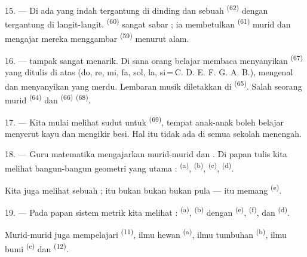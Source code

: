 15. --- Di  ada  yang
indah tergantung di dinding dan sebuah 
\textsuperscript{(62)} dengan  tergantung di
langit-langit.  \textsuperscript{(60)} sangat sabar ;
ia membetulkan  \textsuperscript{(61)} murid dan
mengajar mereka menggambar 
\textsuperscript{(59)} menurut alam.

16. ---  tampak sangat menarik. Di sana orang
belajar membaca  menyanyikan 
\textsuperscript{(67)} yang ditulis di atas 
(do, re, mi, fa, sol, la, si\,=\,C. D. E. F. G. A. B.), mengenal
 dan menyanyikan  yang merdu.
Lembaran musik diletakkan di 
\textsuperscript{(65)}. Salah seorang murid 
\textsuperscript{(64)} dan  \textsuperscript{(66)}
 \textsuperscript{(68)}.

17. --- Kita mulai melihat sudut  untuk
 \textsuperscript{(69)}, tempat anak-anak
boleh belajar menyerut kayu dan mengikir besi. Hal itu tidak ada di
semua sekolah menengah.

\VUsaut{5.0mm}
\VUsaut{3.6mm}

18. --- Guru matematika mengajarkan  murid-murid
 dan . Di papan tulis kita melihat bangun-bangun geometri yang
utama :  \textsuperscript{(a)},  \textsuperscript{(b)}, 
\textsuperscript{(c)},  \textsuperscript{(d)}.

Kita juga melihat sebuah  ; itu bukan
 bukan  bukan pula
 — itu memang 
\textsuperscript{(e)}.

19. --- Pada papan sistem metrik kita melihat : 
\textsuperscript{(a)},  \textsuperscript{(b)} dengan
  \textsuperscript{(e)},
 \textsuperscript{(f)},  dan
 \textsuperscript{(d)}.

Murid-murid juga mempelajari  \textsuperscript{(11)},
ilmu hewan \textsuperscript{(a)}, ilmu tumbuhan \textsuperscript{(b)},
ilmu bumi \textsuperscript{(c)} dan 
\textsuperscript{(12)}.

